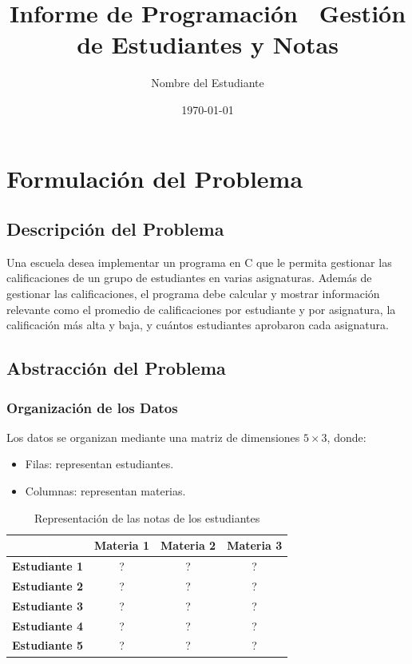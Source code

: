 \documentclass[12pt]{article}
\title{Informe de Programación \ Gestión de Estudiantes y Notas}
\author{Nombre del Estudiante}
\date{\today}
\begin{document}
\maketitle

\tableofcontents
\newpage

\section{Formulación del Problema}

\subsection{Descripción del Problema}
Una escuela desea implementar un programa en C que le permita
gestionar las calificaciones de un grupo de estudiantes en varias asignaturas. Además de gestionar
las calificaciones, el programa debe calcular y mostrar información relevante como el promedio
de calificaciones por estudiante y por asignatura, la calificación más alta y baja, y cuántos
estudiantes aprobaron cada asignatura.

\subsection{Abstracción del Problema}

\subsubsection{Organización de los Datos}
Los datos se organizan mediante una matriz de dimensiones $5 \times 3$, donde:
\begin{itemize}
\item Filas: representan estudiantes.
\item Columnas: representan materias.
\end{itemize}

\begin{table}[h!]
\centering
\begin{tabular}{c|c|c|c}
\textbf{} & \textbf{Materia 1} & \textbf{Materia 2} & \textbf{Materia 3} \\ \hline
\textbf{Estudiante 1} & ? & ? & ? \\
\textbf{Estudiante 2} & ? & ? & ? \\
\textbf{Estudiante 3} & ? & ? & ? \\
\textbf{Estudiante 4} & ? & ? & ? \\
\textbf{Estudiante 5} & ? & ? & ? \\
\end{tabular}
\caption{Representación de las notas de los estudiantes}
\end{table}
\end{document}
